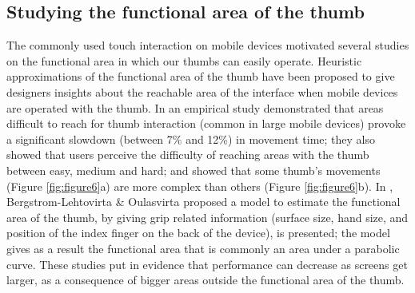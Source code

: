 \documentclass{sigchi}
\begin{document}
\subsection{Studying the functional area of the thumb}
The commonly used touch interaction on mobile devices motivated several studies on the functional area in which our thumbs can easily operate. Heuristic approximations of the functional area of the thumb \cite{hoober13,Clark,Curtis,Wroblewski} have been proposed to give designers insights about the reachable area of the interface when mobile devices are operated with the thumb. In \cite{Karlson06understandingsingle-handed} an empirical study demonstrated that areas difficult to reach for thumb interaction (common in large mobile devices) provoke a significant slowdown (between 7\% and 12\%) in movement time; they also showed that users perceive the difficulty of reaching areas with the thumb between easy, medium and hard; and showed that some thumb’s movements (Figure \ref{fig:figure6}a) are more complex than others (Figure \ref{fig:figure6}b). In \cite{Bergstrom-Lehtovirta:2014:MFA:2611528.2557354}, Bergstrom-Lehtovirta \& Oulasvirta proposed a model to estimate the functional area of the thumb, by giving grip related information (surface size, hand size, and position of the index finger on the back of the device), is presented; the model gives as a result the functional area that is commonly an area under a parabolic curve. These studies put in evidence that performance can decrease as screens get larger, as a consequence of bigger areas outside the functional area of the thumb.

\end{document}
